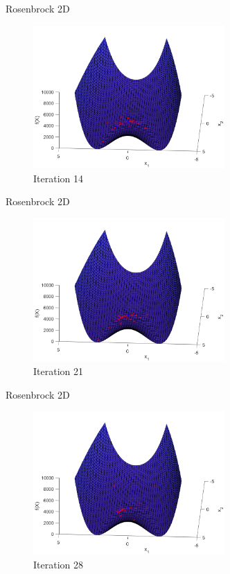 \documentclass[xcolor=table]{beamer}
\begin{document}
\begin{frame}{Rosenbrock 2D}
  \begin{figure}[h]
  \begin{center}
    \includegraphics[width=0.65\textwidth]{img/smpl/rosn2d-1-100/loa-iter-14}
    \caption{Iteration 14}
  \end{center}
  \end{figure}
\end{frame}
\begin{frame}{Rosenbrock 2D}
  \begin{figure}[h]
  \begin{center}
    \includegraphics[width=0.65\textwidth]{img/smpl/rosn2d-1-100/loa-iter-21}
    \caption{Iteration 21}
  \end{center}
  \end{figure}
\end{frame}
\begin{frame}{Rosenbrock 2D}
  \begin{figure}[h]
  \begin{center}
    \includegraphics[width=0.65\textwidth]{img/smpl/rosn2d-1-100/loa-iter-28}
    \caption{Iteration 28}
  \end{center}
  \end{figure}
\end{frame}
\end{document}

